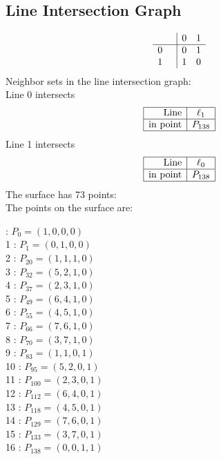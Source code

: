 \documentclass{article}
\begin{document}
{\subsection*{Line Intersection Graph}
{\arraycolsep=1pt
$$
\begin{array}{rr|*{2}r}
 &  & 0 & 1\\
\hline
0 &  & 0 & 1\\
1 &  & 1 & 0\\
\end{array}
$$
}%
Neighbor sets in the line intersection graph:\\
Line 0 intersects 
$$
\begin{array}{|r*{1}{|c}|}
\hline
\mbox{Line}  & \ell_{1}\\
\hline
\mbox{in point}  & P_{138}\\
\hline
\end{array}
$$
Line 1 intersects 
$$
\begin{array}{|r*{1}{|c}|}
\hline
\mbox{Line}  & \ell_{0}\\
\hline
\mbox{in point}  & P_{138}\\
\hline
\end{array}
$$
The surface has 73 points:\\
The points on the surface are:\\
\begin{multicols}{3}
 : $P_{0}=( 1, 0, 0, 0 )$\\
1 : $P_{1}=( 0, 1, 0, 0 )$\\
2 : $P_{20}=( 1, 1, 1, 0 )$\\
3 : $P_{32}=( 5, 2, 1, 0 )$\\
4 : $P_{37}=( 2, 3, 1, 0 )$\\
5 : $P_{49}=( 6, 4, 1, 0 )$\\
6 : $P_{55}=( 4, 5, 1, 0 )$\\
7 : $P_{66}=( 7, 6, 1, 0 )$\\
8 : $P_{70}=( 3, 7, 1, 0 )$\\
9 : $P_{83}=( 1, 1, 0, 1 )$\\
10 : $P_{95}=( 5, 2, 0, 1 )$\\
11 : $P_{100}=( 2, 3, 0, 1 )$\\
12 : $P_{112}=( 6, 4, 0, 1 )$\\
13 : $P_{118}=( 4, 5, 0, 1 )$\\
14 : $P_{129}=( 7, 6, 0, 1 )$\\
15 : $P_{133}=( 3, 7, 0, 1 )$\\
16 : $P_{138}=( 0, 0, 1, 1 )$\\

\end{multicols}}
\end{document}
